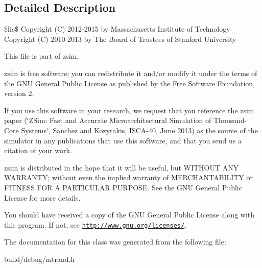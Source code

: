\subsection{Detailed Description}
\$lic\$ Copyright (C) 2012-\/2015 by Massachusetts Institute of Technology Copyright (C) 2010-\/2013 by The Board of Trustees of Stanford University

This file is part of zsim.

zsim is free software; you can redistribute it and/or modify it under the terms of the G\-N\-U General Public License as published by the Free Software Foundation, version 2.

If you use this software in your research, we request that you reference the zsim paper (\char`\"{}\-Z\-Sim\-: Fast and Accurate Microarchitectural Simulation of
\-Thousand-\/\-Core Systems\char`\"{}, Sanchez and Kozyrakis, I\-S\-C\-A-\/40, June 2013) as the source of the simulator in any publications that use this software, and that you send us a citation of your work.

zsim is distributed in the hope that it will be useful, but W\-I\-T\-H\-O\-U\-T A\-N\-Y W\-A\-R\-R\-A\-N\-T\-Y; without even the implied warranty of M\-E\-R\-C\-H\-A\-N\-T\-A\-B\-I\-L\-I\-T\-Y or F\-I\-T\-N\-E\-S\-S F\-O\-R A P\-A\-R\-T\-I\-C\-U\-L\-A\-R P\-U\-R\-P\-O\-S\-E. See the G\-N\-U General Public License for more details.

You should have received a copy of the G\-N\-U General Public License along with this program. If not, see \href{http://www.gnu.org/licenses/}{\tt http\-://www.\-gnu.\-org/licenses/}. 

The documentation for this class was generated from the following file\-:\begin{DoxyCompactItemize}
\item 
build/debug/mtrand.\-h\end{DoxyCompactItemize}
